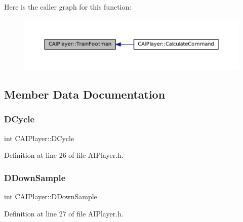 Here is the caller graph for this function\+:\nopagebreak
\begin{figure}[H]
\begin{center}
\leavevmode
\includegraphics[width=350pt]{classCAIPlayer_aa3f9c1d0d449a45a24e065d2086527b0_icgraph}
\end{center}
\end{figure}


\subsection{Member Data Documentation}
\hypertarget{classCAIPlayer_adf12a7afe7ea86410b18eff47fa95253}{}\label{classCAIPlayer_adf12a7afe7ea86410b18eff47fa95253} 
\subsubsection{\texorpdfstring{D\+Cycle}{DCycle}}
{\footnotesize\ttfamily int C\+A\+I\+Player\+::\+D\+Cycle\hspace{0.3cm}{\ttfamily [protected]}}



Definition at line 26 of file A\+I\+Player.\+h.

\hypertarget{classCAIPlayer_a091aed92cb9ad1a789900a6394d2f352}{}\label{classCAIPlayer_a091aed92cb9ad1a789900a6394d2f352} 
\subsubsection{\texorpdfstring{D\+Down\+Sample}{DDownSample}}
{\footnotesize\ttfamily int C\+A\+I\+Player\+::\+D\+Down\+Sample\hspace{0.3cm}{\ttfamily [protected]}}



Definition at line 27 of file A\+I\+Player.\+h.

\hypertarget{classCAIPlayer_a83b5113c8f7e80df54940b647c5ee2e6}{}\label{classCAIPlayer_a83b5113c8f7e80df54940b647c5ee2e6} 
